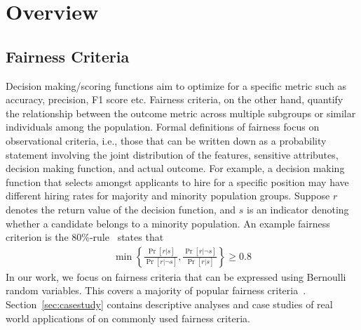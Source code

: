 \section{Overview}
\label{sec:overview}


\subsection{Fairness Criteria}

Decision making/scoring functions aim to optimize for a specific metric such as accuracy, precision, F1 score etc. 
Fairness criteria, on the other hand, quantify the relationship between the outcome metric across multiple subgroups or similar individuals among the population. 
Formal definitions of fairness focus on observational criteria, i.e., those that can be written down as a probability statement involving the joint distribution of the features, sensitive attributes, decision making function, and actual outcome. %
For example, a decision making function that selects amongst applicants to hire for a specific position may have different hiring rates for majority and minority population groups. 
Suppose $r$ denotes the return value of the decision function, and $s$ is an indicator denoting whether a candidate belongs to a minority population.
An example fairness criterion is the 80\%-rule~\citep{zafar2017fairness} states that
\begin{align*}
    \min\left\{\frac{\Pr[r|s]}{\Pr[r|\neg s]},  \frac{\Pr[r|\neg s]}{\Pr[r| s]} \right\} \geq 0.8 
\end{align*}
In our work, we focus on fairness criteria that can be expressed using Bernoulli random variables.
This covers a majority of popular fairness criteria~\citep{verma2018fairness}.
Section~\ref{sec:casestudy} contains descriptive analyses and case studies of real world applications of \AVOIRmethodname{} on commonly used fairness criteria.

